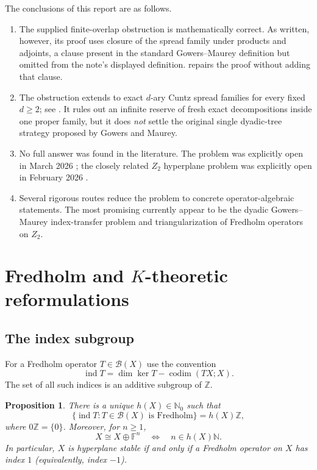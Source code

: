 \documentclass[11pt]{article}
\newtheorem{proposition}[theorem]{Proposition}
\theoremstyle{definition}
\theoremstyle{remark}
\newcommand{\F}{\mathbb F}
\newcommand{\N}{\mathbb N}
\newcommand{\Z}{\mathbb Z}
\newcommand{\B}{\mathcal B}
\newcommand{\ind}{\operatorname{ind}}
\newcommand{\codim}{\operatorname{codim}}
\begin{document}
The conclusions of this report are as follows.
\begin{enumerate}[label=\textup{(\arabic*)},leftmargin=2.2em]
\item The supplied finite-overlap obstruction is mathematically correct.  As
written, however, its proof uses closure of the spread family under products
and adjoints, a clause present in the standard Gowers--Maurey definition but
omitted from the note's displayed definition.   repairs
the proof without adding that clause.
\item The obstruction extends to exact $d$-ary Cuntz spread families for every
fixed $d\ge2$; see .  It rules out an infinite reserve of fresh
exact decompositions inside one proper family, but it does \emph{not} settle the
original single dyadic-tree strategy proposed by Gowers and Maurey.
\item No full answer was found in the literature.  The problem was explicitly
open in March 2026 \cite{AlbiacAnsorena2026}; the closely related $Z_2$
hyperplane problem was explicitly open in February 2026
\cite{CarreraFerenczi2026}.
\item Several rigorous routes reduce the problem to concrete operator-algebraic
statements.  The most promising currently appear to be the dyadic
Gowers--Maurey index-transfer problem and triangularization of Fredholm
operators on $Z_2$.
\end{enumerate}

\section{Fredholm and $K$-theoretic reformulations}

\subsection{The index subgroup}

For a Fredholm operator $T\in\B(X)$ use the convention
\[
 \ind T=\dim\ker T-\codim(TX;X).
\]
The set of all such indices is an additive subgroup of $\Z$.

\begin{proposition}\label{prop:index-subgroup}
There is a unique $h(X)\in\N_0$ such that
\[
 \{\ind T:T\in\B(X)\text{ is Fredholm}\}=h(X)\Z,
\]
where $0\Z=\{0\}$.  Moreover, for $n\ge1$,
\[
 X\cong X\oplus\F^n
 \quad\Longleftrightarrow\quad
 n\in h(X)\N.
\]
In particular, $X$ is hyperplane stable if and only if a Fredholm operator on
$X$ has index $1$ (equivalently, index $-1$).
\end{proposition}
\end{document}
